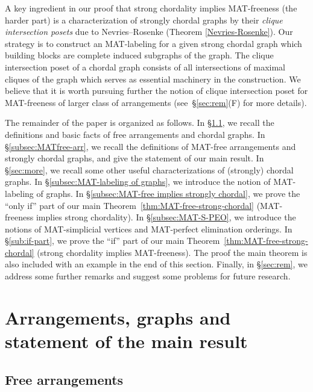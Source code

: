 \documentclass[ALCO, Unicode,published]{cedram}
\begin{document}
A key ingredient in our proof that strong chordality implies MAT-freeness (the harder part) is a characterization of strongly chordal graphs by their \emph{clique intersection posets} due to Nevries--Rosenke \cite{nevries2015characterizing-dam} (\cf Theorem \ref{Nevries-Rosenke}). 
Our strategy is to construct an MAT-labeling for a given strong chordal graph which building blocks are complete induced subgraphs of the graph.
The clique intersection poset of a chordal graph consists of all intersections of maximal cliques of the graph which serves as  essential machinery in the construction.
We believe that it is worth pursuing further the notion of clique intersection poset for MAT-freeness of larger class of arrangements (see~\S\ref{sec:rem}(F) for more details).

The remainder of the paper is organized as follows. 
In \S \ref{subsec:free-arr}, we recall the definitions and basic facts of free arrangements and chordal graphs. 
In \S \ref{subsec:MATfree-arr}, we recall the definitions of MAT-free arrangements and strongly chordal graphs, and give the statement of our main result. 
In \S \ref{sec:more}, we recall some other useful characterizations of (strongly) chordal graphs.
In \S \ref{subsec:MAT-labeling of graphs}, we introduce the notion of MAT-labeling of graphs. 
In \S \ref{subsec:MAT-free implies strongly chordal}, we prove the ``only if'' part of our main Theorem~\ref{thm:MAT-free-strong-chordal} (MAT-freeness implies strong chordality).
In \S \ref{subsec:MAT-S-PEO}, we introduce the notions of MAT-simplicial vertices and MAT-perfect elimination orderings.
In \S \ref{sub:if-part}, we prove the ``if'' part of our main Theorem~\ref{thm:MAT-free-strong-chordal} (strong chordality implies MAT-freeness). 
The proof the main theorem is also included with an example in the end of this section. 
Finally, in \S\ref{sec:rem}, we address some further remarks and suggest some problems for future research.

\section{Arrangements, graphs and statement of the main result}
\label{sec:main-result}
\subsection{Free arrangements}
\label{subsec:free-arr}
 
\end{document}
